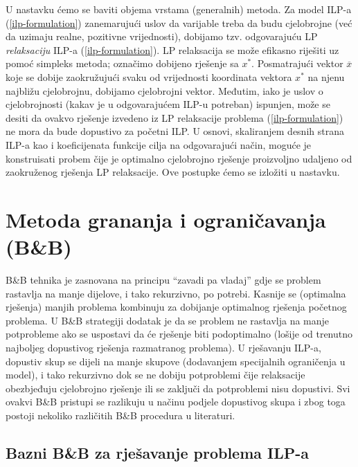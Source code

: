 \documentclass[a4paper, utf8, 11pt, colorlinks]{book}
\begin{document}
U nastavku ćemo se baviti objema vrstama (generalnih) metoda. Za model ILP-a (\ref{ilp-formulation}) zanemarujući uslov da varijable treba da budu cjelobrojne (već da uzimaju realne, pozitivne vrijednosti), dobijamo tzv. odgovarajuću LP \emph{relaksaciju} ILP-a (\ref{ilp-formulation}). LP relaksacija se može efikasno riješiti uz pomoć simpleks metoda; označimo dobijeno rješenje sa $x^*$. Posmatrajući vektor $\overline{x}$ koje se dobije zaokružujući svaku od vrijednosti koordinata vektora $x^*$ na njenu najbližu cjelobrojnu, dobijamo cjelobrojni vektor. Međutim, iako je uslov o cjelobrojnosti (kakav je u odgovarajućem ILP-u potreban) ispunjen, može se desiti da ovakvo rješenje izvedeno iz LP relaksacije problema (\ref{ilp-formulation}) ne mora da bude dopustivo za početni ILP. U osnovi, skaliranjem desnih strana ILP-a kao i koeficijenata funkcije cilja na odgovarajući način, moguće je konstruisati probem čije je optimalno cjelobrojno rješenje proizvoljno udaljeno od zaokruženog rješenja LP relaksacije. Ove postupke ćemo se izložiti u nastavku. 

\section{Metoda grananja i ograničavanja (B\&B)}
B\&B tehnika je zasnovana na principu ``zavadi pa vladaj'' gdje se problem rastavlja na manje dijelove, i tako rekurzivno, po potrebi. Kasnije se (optimalna rješenja) manjih problema kombinuju za dobijanje optimalnog rješenja početnog problema.  U B\&B strategiji dodatak je da se 
problem ne rastavlja na manje potprobleme ako se uspostavi da će rješenje biti podoptimalno (lošije od trenutno najboljeg dopustivog rješenja razmatranog problema). U rješavanju ILP-a, dopustiv skup se dijeli na manje skupove (dodavanjem specijalnih ograničenja u model), i tako rekurzivno  dok se ne dobiju potproblemi čije relaksacije obezbjeđuju cjelobrojno rješenje ili se zaključi da potproblemi nisu dopustivi. Svi ovakvi B\&B pristupi se razlikuju u načinu podjele dopustivog skupa i zbog toga   postoji nekoliko različitih B\&B procedura u literaturi. 

\subsection{Bazni B\&B za rješavanje problema ILP-a}
\end{document}
